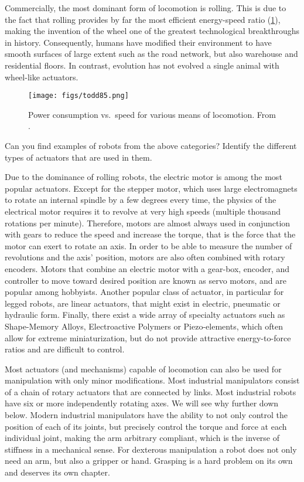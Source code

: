 Commercially, the most dominant form of locomotion is rolling. This is due to the fact that rolling provides by far the most efficient energy-speed ratio (\cref{fig:todd}), making the invention of the wheel one of the greatest technological breakthroughs in history. Consequently, humans have modified their environment to have smooth surfaces of large extent such as the road network, but also warehouse and residential floors. In contrast, evolution has not evolved a single animal with wheel-like actuators.

\begin{figure}
	\centering
		\texttt{[image: figs/todd85.png]}
	\caption{Power consumption vs.\ speed for various means of locomotion. From \protect{}.}
	\label{fig:todd}
\end{figure}


\begin{mdframed}Can you find examples of robots from the above categories? Identify the different types of actuators that are used in them.
\end{mdframed}

Due to the dominance of rolling robots, the electric motor is among the most popular actuators. Except for the stepper motor, which uses large electromagnets to rotate an internal spindle by a few degrees every time, the physics of the electrical motor requires it to revolve at very high speeds (multiple thousand rotations per minute). Therefore, motors are almost always used in conjunction with gears to reduce the speed and increase the torque, that is the force that the motor can exert to rotate an axis. In order to be able to measure the number of revolutions and the axis' position, motors are also often combined with rotary encoders. Motors that combine an electric motor with a gear-box, encoder, and controller to move toward desired position are known as servo motors, and are popular among hobbyists. Another popular class of actuator, in particular for legged robots, are linear actuators, that might exist in electric, pneumatic or hydraulic form. Finally, there exist a wide array of specialty actuators such as Shape-Memory Alloys, Electroactive Polymers or Piezo-elements, which often allow for extreme miniaturization, but do not provide attractive energy-to-force ratios and are difficult to control.

Most actuators (and mechanisms) capable of locomotion can also be used for manipulation with only minor modifications. Most industrial manipulators consist of a chain of rotary actuators that are connected by links. Most industrial robots have six or more independently rotating axes. We will see why further down below. Modern industrial manipulators have the ability to not only control the position of each of its joints, but precisely control the torque and force at each individual joint, making the arm arbitrary compliant, which is the inverse of stiffness in a mechanical sense. For dexterous manipulation a robot does not only need an arm, but also a gripper or hand. Grasping is a hard problem on its own and deserves its own chapter.

